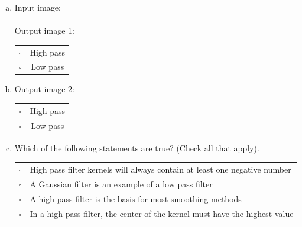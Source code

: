 \begin{enumerate}[(a)]
\item
Input image:\\
 \\
Output image 1:\\
\begin{tabular}[h]{lc}
$\square$ & High pass \\
$\square$ & Low pass \\
\end{tabular}

\item
Output image 2:\\
\begin{tabular}[h]{lc}
$\square$ & High pass \\
$\square$ & Low pass \\
\end{tabular}

\item
Which of the following statements are true? (Check all that apply).

\begin{tabular}[h]{ll}
$\square$ & High pass filter kernels will always contain at least one negative number \\
$\square$ & A Gaussian filter is an example of a low pass filter \\
$\square$ & A high pass filter is the basis for most smoothing methods \\
$\square$ & In a high pass filter, the center of the kernel must have the highest value \\
\end{tabular}

\end{enumerate}



